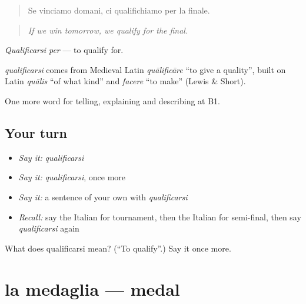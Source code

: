 \begin{quote}
Se vinciamo domani, ci qualifichiamo per la finale.
\end{quote}

\begin{quote}
\emph{If we win tomorrow, we qualify for the final.}
\end{quote}

\emph{Qualificarsi per} — to qualify for.

\begin{cousinweb}
\emph{qualificarsi} comes from Medieval Latin \emph{quālificāre} \textquotedblleft{}to give a quality\textquotedblright{}, built on Latin \emph{quālis} \textquotedblleft{}of what kind\textquotedblright{} and \emph{facere} \textquotedblleft{}to make\textquotedblright{} (Lewis \& Short).
\end{cousinweb}

\begin{grammarlens}[title={What you've built}]
One more word for telling, explaining and describing at B1.
\end{grammarlens}

\subsection*{Your turn}
\begin{itemize}
\raggedright
  \item \emph{Say it:} \emph{qualificarsi}
  \item \emph{Say it:} \emph{qualificarsi}, once more
  \item \emph{Say it:} a sentence of your own with \emph{qualificarsi}
  \item \emph{Recall:} say the Italian for tournament, then the Italian for semi-final, then say \emph{qualificarsi} again
\end{itemize}

\begin{tcolorbox}[breakable,colback=teal!4,colframe=teal!35!black,title={Before you move on}]
What does qualificarsi mean? (\textquotedblleft{}To qualify\textquotedblright{}.) Say it once more.
\end{tcolorbox}
\section[la medaglia]{la medaglia — medal}

\label{lesson:IT-C512-medaglia}



